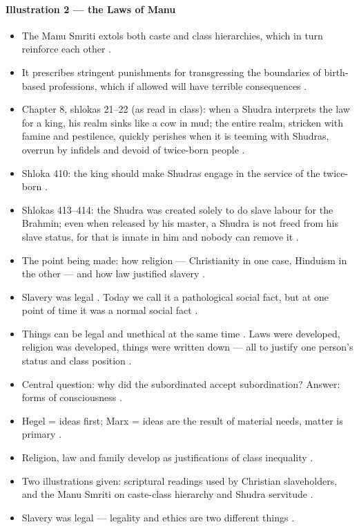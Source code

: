 \paragraph{Illustration 2 --- the Laws of Manu}
\begin{itemize}
    \item The Manu Smriti extols both caste and class hierarchies, which in turn reinforce each other .
    \item It prescribes stringent punishments for transgressing the boundaries of birth-based professions, which if allowed will have terrible consequences .
    \item Chapter 8, shlokas 21--22 (as read in class): when a Shudra interprets the law for a king, his realm sinks like a cow in mud; the entire realm, stricken with famine and pestilence, quickly perishes when it is teeming with Shudras, overrun by infidels and devoid of twice-born people .
    \item Shloka 410: the king should make Shudras engage in the service of the twice-born .
    \item Shlokas 413--414: the Shudra was created solely to do slave labour for the Brahmin; even when released by his master, a Shudra is not freed from his slave status, for that is innate in him and nobody can remove it .
    \item The point being made: how religion --- Christianity in one case, Hinduism in the other --- and how law justified slavery .
\end{itemize}

\begin{CriticalPoint}
\begin{itemize}
    \item Slavery was legal . Today we call it a pathological social fact, but at one point of time it was a normal social fact .
    \item Things can be legal and unethical at the same time . Laws were developed, religion was developed, things were written down --- all to justify one person's status and class position .
\end{itemize}
\end{CriticalPoint}

\begin{QuickRevision}
\begin{itemize}
    \item Central question: why did the subordinated accept subordination? Answer: forms of consciousness .
    \item Hegel = ideas first; Marx = ideas are the result of material needs, matter is primary .
    \item Religion, law and family develop as justifications of class inequality .
    \item Two illustrations given: scriptural readings used by Christian slaveholders, and the Manu Smriti on caste-class hierarchy and Shudra servitude .
    \item Slavery was legal --- legality and ethics are two different things .
\end{itemize}
\end{QuickRevision}

